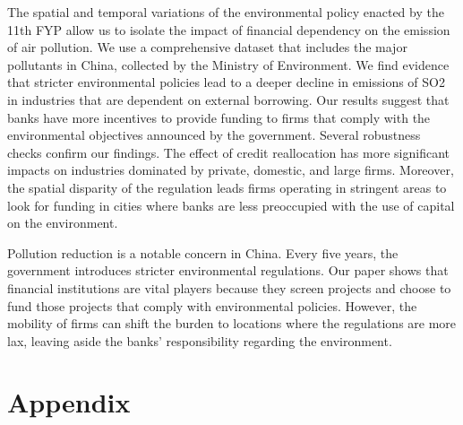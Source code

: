 \documentclass[12pt]{article}
\begin{document}
The spatial and temporal variations of the environmental policy enacted by the 11th FYP allow us to isolate the impact of financial dependency on the emission of air pollution. We use a comprehensive dataset that includes the major pollutants in China, collected by the Ministry of Environment. We find evidence that stricter environmental policies lead to a deeper decline in emissions of SO2 in industries that are dependent on external borrowing. Our results suggest that banks have more incentives to provide funding to firms that comply with the environmental objectives announced by the government. Several robustness checks confirm our findings. The effect of credit reallocation has more significant impacts on industries dominated by private, domestic, and large firms. Moreover, the spatial disparity of the regulation leads firms operating in stringent areas to look for funding in cities where banks are less preoccupied with the use of capital on the environment.  

Pollution reduction is a notable concern in China. Every five years, the government introduces stricter environmental regulations. Our paper shows that financial institutions are vital players because they screen projects and choose to fund those projects that comply with environmental policies. However, the mobility of firms can shift the burden to locations where the regulations are more lax, leaving aside the banks' responsibility regarding the environment.

\singlespacing
\setlength\bibsep{0pt}

\clearpage





\section*{Appendix} \label{sec:appendixa}
\end{document}
